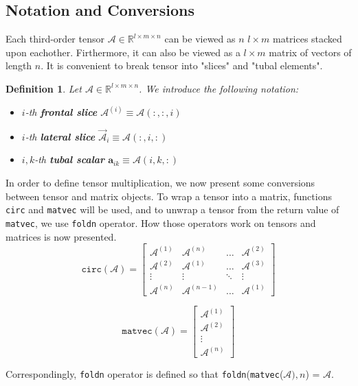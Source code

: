 \documentclass[twoside]{article}
\newtheorem{defn}{Definition}
\newcommand{\code}[1]{\texttt{#1}}
\begin{document}
\begin{multicols}{2}
\subsection{Notation and Conversions}
Each third-order tensor $\mathcal{A} \in \mathbb{R}^{l \times m \times n}$ can be viewed as $n$ $l \times m$ matrices stacked upon eachother. Firthermore, it can also be viewed as a $l \times m$ matrix of vectors of length $n$. It is convenient to break tensor into "slices" and "tubal elements".
\begin{defn} Let $\mathcal{A} \in \mathbb{R}^{l \times m \times n}$. We introduce the following notation:
\begin{itemize}
	\item $i$-th \textbf{frontal slice} $\mathcal{A}^{(i)} \equiv \mathcal{A}(:,:,i)$
	\item $i$-th \textbf{lateral slice} $\overrightarrow{\mathcal{A}}_i \equiv \mathcal{A}(:,i,:)$
	\item $i,k$-th \textbf{tubal scalar} $\textbf{a}_{ik} \equiv \mathcal{A}(i,k,:)$
\end{itemize}
\end{defn}

In order to define tensor multiplication, we now present some conversions between tensor and matrix objects. To wrap a tensor into a matrix, functions \code{circ} and \code{matvec} will be used, and to unwrap a tensor from the return value of \code{matvec}, we use \code{foldn} operator. How those operators work on tensors and matrices is now presented.
\[
\code{circ}(\mathcal{A}) =
  \begin{bmatrix}
    \mathcal{A}^{(1)} & \mathcal{A}^{(n)} & \dots & \mathcal{A}^{(2)} \\
    \mathcal{A}^{(2)} & \mathcal{A}^{(1)} &  \dots  & \mathcal{A}^{(3)} \\
    \vdots            & \vdots            &  \ddots & \vdots \\
    \mathcal{A}^{(n)} & \mathcal{A}^{(n-1)} &  \dots & \mathcal{A}^{(1)} 
  \end{bmatrix}
\]

\[
\code{matvec}(\mathcal{A}) =
  \begin{bmatrix}
    \mathcal{A}^{(1)} \\
    \mathcal{A}^{(2)} \\
    \vdots            \\
    \mathcal{A}^{(n)} 
  \end{bmatrix}
\]

\noindent Correspondingly, \code{foldn} operator is defined so that \code{foldn}(\code{matvec}($\mathcal{A}),n$) = $\mathcal{A}$.


\end{multicols}
\end{document}
